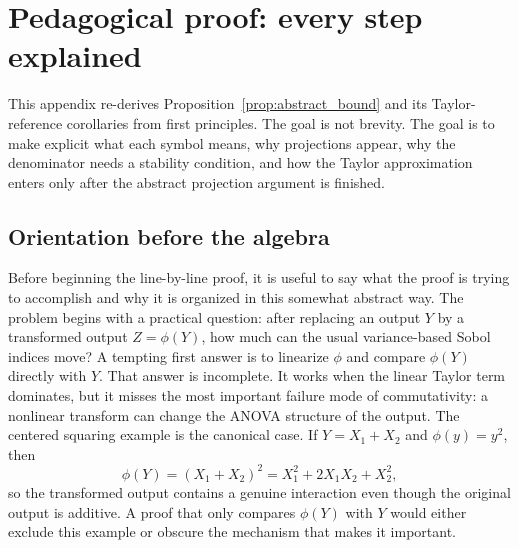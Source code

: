 \documentclass[11pt,letterpaper]{article}
\theoremstyle{remark}
\begin{document}
\appendix

\section{Pedagogical proof: every step explained}
\label{app:pedagogical}

This appendix re-derives Proposition~\ref{prop:abstract_bound} and its
Taylor-reference corollaries from first principles. The goal is not brevity. The
goal is to make explicit what each symbol means, why projections appear, why the
denominator needs a stability condition, and how the Taylor approximation enters
only after the abstract projection argument is finished.

\subsection*{Orientation before the algebra}

Before beginning the line-by-line proof, it is useful to say what the proof is
trying to accomplish and why it is organized in this somewhat abstract way. The
problem begins with a practical question: after replacing an output $Y$ by a
transformed output $Z=\phi(Y)$, how much can the usual variance-based Sobol
indices move? A tempting first answer is to linearize $\phi$ and compare
$\phi(Y)$ directly with $Y$. That answer is incomplete. It works when the
linear Taylor term dominates, but it misses the most important failure mode of
commutativity: a nonlinear transform can change the ANOVA structure of the
output. The centered squaring example is the canonical case. If
$Y=X_1+X_2$ and $\phi(y)=y^2$, then
\begin{equation}
  \phi(Y)=(X_1+X_2)^2=X_1^2+2X_1X_2+X_2^2,
\end{equation}
so the transformed output contains a genuine interaction even though the
original output is additive. A proof that only compares $\phi(Y)$ with $Y$
would either exclude this example or obscure the mechanism that makes it
important.
\end{document}
